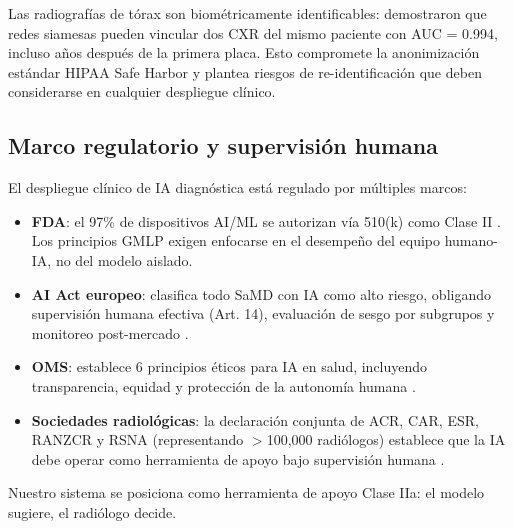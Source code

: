 Las radiograf\'ias de t\'orax son biom\'etricamente identificables: \cite{packhauser2022reidentification} demostraron que redes siamesas pueden vincular dos CXR del mismo paciente con AUC = 0.994, incluso a\~nos despu\'es de la primera placa. Esto compromete la anonimizaci\'on est\'andar HIPAA Safe Harbor y plantea riesgos de re-identificaci\'on que deben considerarse en cualquier despliegue cl\'inico.

\subsection{Marco regulatorio y supervisi\'on humana}

El despliegue cl\'inico de IA diagn\'ostica est\'a regulado por m\'ultiples marcos:

\begin{itemize}
    \item \textbf{FDA}: el 97\% de dispositivos AI/ML se autorizan v\'ia 510(k) como Clase II \cite{fda2026aidevices}. Los principios GMLP exigen enfocarse en el desempe\~no del equipo humano-IA, no del modelo aislado.
    \item \textbf{AI Act europeo}: clasifica todo SaMD con IA como alto riesgo, obligando supervisi\'on humana efectiva (Art. 14), evaluaci\'on de sesgo por subgrupos y monitoreo post-mercado \cite{euaiact2024}.
    \item \textbf{OMS}: establece 6 principios \'eticos para IA en salud, incluyendo transparencia, equidad y protecci\'on de la autonom\'ia humana \cite{who2024ethics}.
    \item \textbf{Sociedades radiol\'ogicas}: la declaraci\'on conjunta de ACR, CAR, ESR, RANZCR y RSNA (representando $>$100,000 radi\'ologos) establece que la IA debe operar como herramienta de apoyo bajo supervisi\'on humana \cite{brady2024multisociety}.
\end{itemize}

Nuestro sistema se posiciona como herramienta de apoyo Clase IIa: el modelo sugiere, el radi\'ologo decide.
